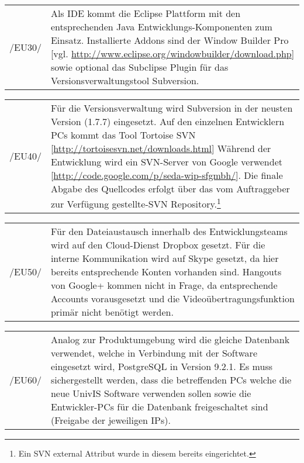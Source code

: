 \begin{tabular}{p{1.5cm}p{14.5cm}}

	 /EU30/	&  Als IDE kommt die Eclipse Plattform mit den entsprechenden Java Entwicklungs-Komponenten zum Einsatz. Installierte Addons sind der Window Builder Pro [vgl. \url{http://www.eclipse.org/windowbuilder/download.php}] sowie optional das Subclipse Plugin für das Versionsverwaltungstool Subversion.\\[0.25cm]

\end{tabular}

\begin{tabular}{p{1.5cm}p{14.5cm}}

	 /EU40/	&  Für die Versionsverwaltung wird Subversion in der neusten Version (1.7.7) eingesetzt. Auf den einzelnen Entwicklern PCs kommt das Tool Tortoise SVN [\url{http://tortoisesvn.net/downloads.html}]
Während der Entwicklung wird ein SVN-Server von Google verwendet [\url{http://code.google.com/p/seda-wip-sfgmbh/}]. Die finale Abgabe des Quellcodes erfolgt über das vom Auftraggeber zur Verfügung gestellte-SVN Repository.\footnote{Ein SVN external Attribut wurde in diesem bereits eingerichtet.}\\[0.25cm]

\end{tabular}

\begin{tabular}{p{1.5cm}p{14.5cm}}

	 /EU50/	&  Für den Dateiaustausch innerhalb des Entwicklungsteams wird auf den Cloud-Dienst Dropbox gesetzt.
Für die interne Kommunikation wird auf Skype gesetzt, da hier bereits entsprechende Konten vorhanden sind. Hangouts von Google+ kommen nicht in Frage, da entsprechende Accounts vorausgesetzt und die Videoübertragungsfunktion primär nicht benötigt werden.\\[0.25cm]

\end{tabular}



\begin{tabular}{p{1.5cm}p{14.5cm}}

	 /EU60/	&  Analog zur Produktumgebung wird die gleiche Datenbank verwendet, welche in Verbindung mit der Software eingesetzt wird, PostgreSQL in Version 9.2.1.
Es muss sichergestellt werden, dass die betreffenden PCs welche die neue UnivIS Software verwenden sollen sowie die Entwickler-PCs für die Datenbank freigeschaltet sind (Freigabe der jeweiligen IPs).\\[0.25cm]

\end{tabular}

